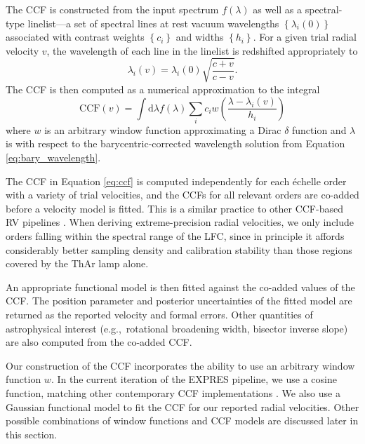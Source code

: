 The CCF is constructed from the input spectrum $f(\lambda)$ as well as a spectral-type line\-list---a set of spectral lines at rest vacuum wavelengths $\left\{\lambda_i(0)\right\}$ associated with contrast weights $\left\{c_i\right\}$ and widths $\left\{h_i\right\}$. For a given trial radial velocity $v$, the wavelength of each line in the linelist is redshifted appropriately to
\begin{equation}
    \lambda_i(v) = \lambda_i(0) \sqrt{\frac{c + v}{c - v}}.
\end{equation}
The CCF is then computed as a numerical approximation to the integral
\begin{equation}
    \mathrm{CCF}(v) = \int \mathrm{d} \lambda f(\lambda) \sum_i c_i w\left(\frac{\lambda - \lambda_i(v)}{h_i}\right)
    \label{eq:ccf}
\end{equation}
where $w$ is an arbitrary window function approximating a Dirac $\delta$ function and $\lambda$ is with respect to the barycentric-corrected wavelength solution from Equation \ref{eq:bary_wavelength}.

The CCF in Equation \ref{eq:ccf} is computed independently for each \'echelle order with a variety of trial velocities, and the CCFs for all relevant orders are co-added before a velocity model is fitted. This is a similar practice to other CCF-based RV pipelines \citep[e.g.~][]{brahm_ceres_2017}. When deriving extreme-precision radial velocities, we only include orders falling within the spectral range of the LFC, since in principle it affords considerably better sampling density and calibration stability than those regions covered by the ThAr lamp alone.

An appropriate functional model is then fitted against the co-added values of the CCF. The position parameter and posterior uncertainties of the fitted model are returned as the reported velocity and formal errors. Other quantities of astrophysical interest (e.g.,~rotational broadening width, bisector inverse slope) are also computed from the co-added CCF.

Our construction of the CCF incorporates the ability to use an arbitrary window function $w$. In the current iteration of the EXPRES pipeline, we use a cosine function, matching other contemporary CCF implementations \citep[e.g.~][]{freudling_automated_2013, brahm_ceres_2017, modigliani_espresso_2019}. We also use a Gaussian functional model to fit the CCF for our reported radial velocities. Other possible combinations of window functions and CCF models are discussed later in this section.


